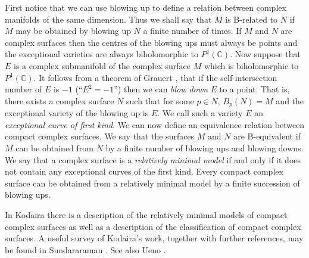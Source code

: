 First notice that we can use blowing up to define a relation between complex manifolds of the same dimension. Thus we shall say that $M$ is B-related to $N$ if $M$ may be obtained by blowing up $N$ a finite number of times. If $M$ and $N$ are complex surfaces then the centres of the blowing ups must always be points and the exceptional varieties are always biholomorphic to $P^1(\mathbb C)$. Now suppose that $E$ is a complex submanifold of the complex surface $M$ which is biholomorphic to $P^1(\mathbb C)$. It follows from a theorem of Grauert \cite{bib:I:grauert-h:1}, that if the self-intersection number of $E$ is $-1$ (``$E^2=-1$'') then we can \emph{blow down} $E$ to a point. That is, there exists a complex surface $N$ such that for some $p\in N$, $B_p(N)=M$ and the exceptional variety of the blowing up is $E$. We call such a variety $E$ an \emph{exceptional curve of first kind}. We can now define an equivalence relation between compact complex surfaces. We say that the surfaces $M$ and $N$ are B-equivalent if $M$ can be obtained from $N$ by a finite number of blowing ups and blowing downs. We say that a complex surface is a \emph{relatively minimal model} if and only if it does not contain any exceptional curves of the first kind. Every compact complex surface can be obtained from a relatively minimal model by a finite succession of blowing ups.

In Kodaira \cite{bib:I:kodaira-k:2} there is a description of the relatively minimal models of compact complex surfaces as well as a description of the classification of compact complex surfaces. A useful survey of Kodaira's work, together with further references, may be found in Sundararaman \cite{bib:I:sundararaman-d:1}. See also Ueno \cite{bib:I:ueno-k:1}.


